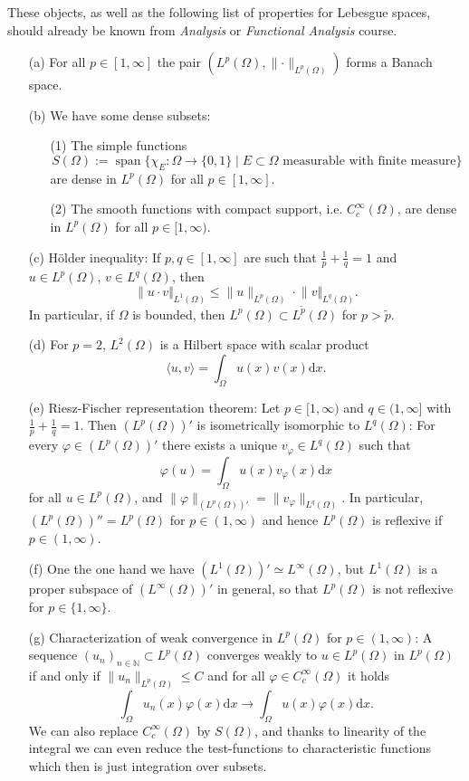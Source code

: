 These objects, as well as the following list of properties for Lebesgue spaces, should already be known from \textit{Analysis} or \textit{Functional Analysis} course.
\begin{itemize}
	\item[(a)] For all $p\in[1,\infty]$ the pair $(L^p(\Omega),\lVert\cdot\rVert_{L^p(\Omega)})$ forms a Banach space.
	\item[(b)] We have some dense subsets:
	\begin{itemize}
		\item[(1)] The simple functions
		\[S(\Omega):=\operatorname{span}\{\chi_E:\Omega\longrightarrow\{0,1\}\mid E\subset\Omega\text{ measurable with finite measure}\}\]
		are dense in $L^p(\Omega)$ for all $p\in[1,\infty]$.
		\item[(2)] The smooth functions with compact support, i.e. $C_c^\infty(\Omega)$, are dense in $L^p(\Omega)$ for all $p\in[1,\infty)$.
	\end{itemize}
	\item[(c)] H\"older inequality: If $p,q\in[1,\infty]$ are such that $\frac{1}{p}+\frac{1}{q}=1$ and $u\in L^p(\Omega)$, $v\in L^q(\Omega)$, then
	\[\lVert u\cdot v\Vert_{L^1(\Omega)}\leq\lVert u\rVert_{L^p(\Omega)}\cdot\lVert v\Vert_{L^q(\Omega)}.\]
	In particular, if $\Omega$ is bounded, then $L^p(\Omega)\subset L^{\tilde{p}}(\Omega)$ for $p>\tilde{p}$.
	\item[(d)] For $p=2$, $L^2(\Omega)$ is a Hilbert space with scalar product
	\[\langle u,v\rangle=\int_\Omega{u(x)v(x)\mathrm{d}x}.\]
	\item[(e)] Riesz-Fischer representation theorem: Let $p\in[1,\infty)$ and $q\in(1,\infty]$ with $\frac{1}{p}+\frac{1}{q}=1$. Then $(L^p(\Omega))'$ is isometrically isomorphic to $L^q(\Omega)$: For every $\varphi\in(L^p(\Omega))'$ there exists a unique $v_\varphi\in L^q(\Omega)$ such that
	\[\varphi(u)=\int_\Omega{u(x)v_\varphi(x)\mathrm{d}x}\]
	for all $u\in L^p(\Omega)$, and $\lVert\varphi\rVert_{(L^p(\Omega))'}=\lVert v_\varphi\rVert_{L^q(\Omega)}$. In particular, $(L^p(\Omega))''=L^p(\Omega)$ for $p\in(1,\infty)$ and hence $L^p(\Omega)$ is reflexive if $p\in(1,\infty)$.
	\item[(f)] One the one hand we have $(L^1(\Omega))'\simeq L^\infty(\Omega)$, but $L^1(\Omega)$ is a proper subspace of $(L^\infty(\Omega))'$ in general, so that $L^p(\Omega)$ is not reflexive for $p\in\{1,\infty\}$.
	\item[(g)] Characterization of weak convergence in $L^p(\Omega)$ for $p\in(1,\infty)$: A sequence $(u_n)_{n\in\mathbb{N}}\subset L^p(\Omega)$ converges weakly to $u\in L^p(\Omega)$ in $L^p(\Omega)$ if and only if $\lVert u_n\rVert_{L^p(\Omega)}\leq C$ and for all $\varphi\in C_c^\infty(\Omega)$ it holds
	\[\int_\Omega{u_n(x)\varphi(x)\mathrm{d}x}\to\int_\Omega{u(x)\varphi(x)\mathrm{d}x}.\]
	We can also replace $C_c^\infty(\Omega)$ by $S(\Omega)$, and thanks to linearity of the integral we can even reduce the test-functions to characteristic functions which then is just integration over subsets.\\[11pt]
\end{itemize}

